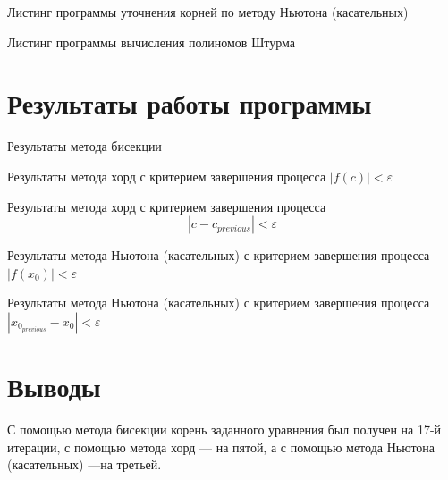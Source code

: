 Листинг программы уточнения корней по методу Ньютона (касательных)
\lstset{inputencoding=utf8, extendedchars=\true}


Листинг программы вычисления полиномов Штурма
\lstset{inputencoding=utf8, extendedchars=\true}


\chapter{Результаты работы программы}

Результаты метода бисекции
\lstset{inputencoding=utf8, extendedchars=\true}


Результаты метода хорд с критерием завершения процесса $ \left| f \left( c \right) \right| < \varepsilon $
\lstset{inputencoding=utf8, extendedchars=\true}


Результаты метода хорд с критерием завершения процесса
$$\left| c - c_{previous} \right| < \varepsilon $$
\lstset{inputencoding=utf8, extendedchars=\true}


Результаты метода Ньютона (касательных) с критерием завершения процесса $ \left| f \left( x_0 \right) \right| < \varepsilon $
\lstset{inputencoding=utf8, extendedchars=\true}


Результаты метода Ньютона (касательных) с критерием завершения процесса $ \left| x_{0_{previous}} - x_0 \right| < \varepsilon $
\lstset{inputencoding=utf8, extendedchars=\true}


\chapter*{Выводы}

С помощью метода бисекции корень заданного уравнения был получен на 17-й итерации,
с помощью метода хорд --- на пятой,
а с помощью метода Ньютона (касательных) ---на третьей.

